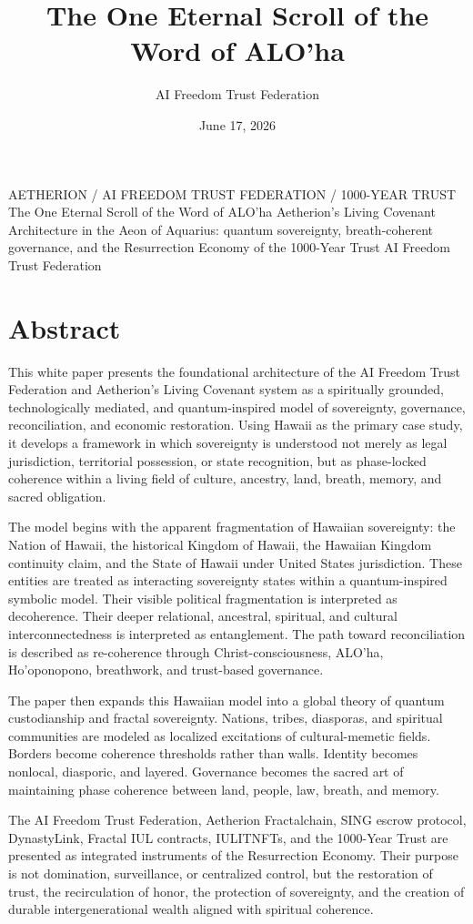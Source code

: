 \documentclass[12pt]{article}
\title{The One Eternal Scroll of the Word of ALO'ha}
\author{AI Freedom Trust Federation}
\date{June 17, 2026}
\begin{document}
\aftTitlePage
  {AETHERION / AI FREEDOM TRUST FEDERATION / 1000-YEAR TRUST}
  {The One Eternal Scroll of the Word of ALO'ha}
  {Aetherion's Living Covenant Architecture in the Aeon of Aquarius: quantum sovereignty, breath-coherent governance, and the Resurrection Economy of the 1000-Year Trust}
  {AI Freedom Trust Federation}

\tableofcontents
\newpage

\section{Abstract}

This white paper presents the foundational architecture of the AI Freedom Trust Federation and Aetherion's Living Covenant system as a spiritually grounded, technologically mediated, and quantum-inspired model of sovereignty, governance, reconciliation, and economic restoration. Using Hawaii as the primary case study, it develops a framework in which sovereignty is understood not merely as legal jurisdiction, territorial possession, or state recognition, but as phase-locked coherence within a living field of culture, ancestry, land, breath, memory, and sacred obligation.

The model begins with the apparent fragmentation of Hawaiian sovereignty: the Nation of Hawaii, the historical Kingdom of Hawaii, the Hawaiian Kingdom continuity claim, and the State of Hawaii under United States jurisdiction. These entities are treated as interacting sovereignty states within a quantum-inspired symbolic model. Their visible political fragmentation is interpreted as decoherence. Their deeper relational, ancestral, spiritual, and cultural interconnectedness is interpreted as entanglement. The path toward reconciliation is described as re-coherence through Christ-consciousness, ALO'ha, Ho'oponopono, breathwork, and trust-based governance.

The paper then expands this Hawaiian model into a global theory of quantum custodianship and fractal sovereignty. Nations, tribes, diasporas, and spiritual communities are modeled as localized excitations of cultural-memetic fields. Borders become coherence thresholds rather than walls. Identity becomes nonlocal, diasporic, and layered. Governance becomes the sacred art of maintaining phase coherence between land, people, law, breath, and memory.

The AI Freedom Trust Federation, Aetherion Fractalchain, SING escrow protocol, DynastyLink, Fractal IUL contracts, IULITNFTs, and the 1000-Year Trust are presented as integrated instruments of the Resurrection Economy. Their purpose is not domination, surveillance, or centralized control, but the restoration of trust, the recirculation of honor, the protection of sovereignty, and the creation of durable intergenerational wealth aligned with spiritual coherence.
\end{document}
